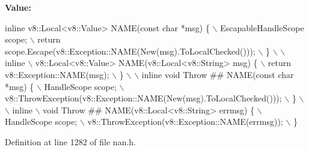 {\bfseries Value\+:}
\begin{DoxyCode}
\textcolor{keyword}{inline} v8::Local<v8::Value> NAME(\textcolor{keyword}{const} \textcolor{keywordtype}{char} *msg) \{                        \(\backslash\)
      EscapableHandleScope scope;                                              \(\backslash\)
      return scope.Escape(v8::Exception::NAME(New(msg).ToLocalChecked()));     \(\backslash\)
    \}                                                                          \(\backslash\)
                                                                               \(\backslash\)
    inline                                                                     \(\backslash\)
    v8::Local<v8::Value> NAME(v8::Local<v8::String> msg) \{                     \(\backslash\)
      return v8::Exception::NAME(msg);                                         \(\backslash\)
    \}                                                                          \(\backslash\)
                                                                               \(\backslash\)
    inline \textcolor{keywordtype}{void} Throw ## NAME(\textcolor{keyword}{const} \textcolor{keywordtype}{char} *msg) \{                               \(\backslash\)
      HandleScope scope;                                                       \(\backslash\)
      v8::ThrowException(v8::Exception::NAME(New(msg).ToLocalChecked()));      \(\backslash\)
    \}                                                                          \(\backslash\)
                                                                               \(\backslash\)
    inline                                                                     \(\backslash\)
    void Throw ## NAME(v8::Local<v8::String> errmsg) \{                         \(\backslash\)
      HandleScope scope;                                                       \(\backslash\)
      v8::ThrowException(v8::Exception::NAME(errmsg));                         \(\backslash\)
    \}
\end{DoxyCode}


Definition at line 1282 of file nan.\+h.

